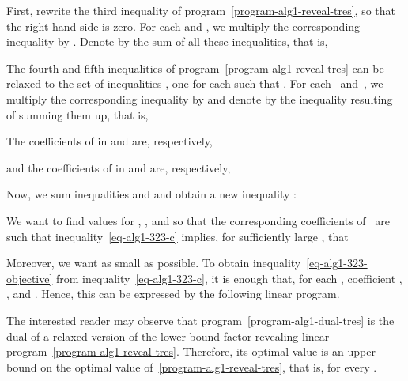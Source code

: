 First, rewrite the third inequality of program~\eqref{program-alg1-reveal-tres},
so that the right-hand side is zero. For each  and , we multiply
the corresponding inequality by . Denote by  the sum of all
these inequalities, that is,





The fourth and fifth inequalities of program~\eqref{program-alg1-reveal-tres}
can be relaxed to the set of inequalities , one for each  such that . For each~ and~,
we multiply the corresponding inequality by  and denote by 
the inequality resulting of summing them up, that is,


The coefficients of  in  and  are, respectively,

and the coefficients of  in  and  are, respectively,


Now, we sum inequalities  and  and obtain a new inequality :


We want to find values for , , and  so that
the corresponding coefficients of~ are such that inequality~\eqref{eq-alg1-323-c}
implies, for sufficiently large , that

Moreover, we want  as small as possible.
To obtain inequality~\eqref{eq-alg1-323-objective} from
inequality~\eqref{eq-alg1-323-c}, it is enough that, for each , coefficient
, , and .
Hence, this can be expressed by the following linear program.


The interested reader may observe that program~\eqref{program-alg1-dual-tres}
is the dual of a relaxed version of the lower bound factor-revealing
linear program~\eqref{program-alg1-reveal-tres}.  Therefore, its optimal value
is an upper bound on the optimal value of~\eqref{program-alg1-reveal-tres}, 
that is,  for every .





